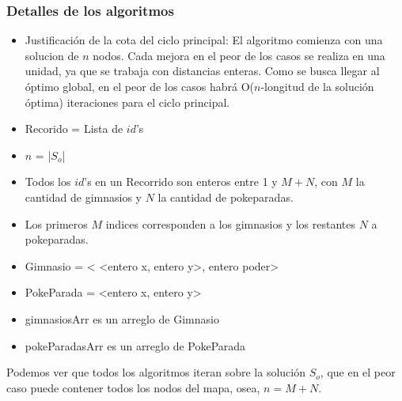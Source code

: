 \begin{algorithm}[H]


\end{algorithm}

\subsubsection*{Detalles de los algoritmos}
\label{sec:alg3}
\begin{itemize}
\item Justificación de la cota del ciclo principal: El algoritmo comienza con una solucion de $n$ nodos. Cada mejora en el peor de los casos se realiza en una unidad, ya que se trabaja con distancias enteras. Como se busca llegar al óptimo global, en el peor de los casos habrá O($n$-longitud de la solución óptima) iteraciones para el ciclo principal.
\item Recorido = Lista de $id$'s
\item $n$ = |$S_o$|
\item Todos los $id$'s en un Recorrido son enteros entre 1 y $M+N$, con $M$ la cantidad de gimnasios y $N$ la cantidad de pokeparadas.
\item Los primeros $M$ indices corresponden a los gimnasios y los restantes $N$ a pokeparadas.
\item Gimnasio = < <entero x, entero y>, entero poder>
\item PokeParada = <entero x, entero y>
\item gimnasiosArr es un arreglo de Gimnasio
\item pokeParadasArr es un arreglo de PokeParada
\end{itemize}

Podemos ver que todos los algoritmos iteran sobre la solución $S_o$, que en el peor caso puede contener todos los nodos del mapa, osea, $n=M+N$.

